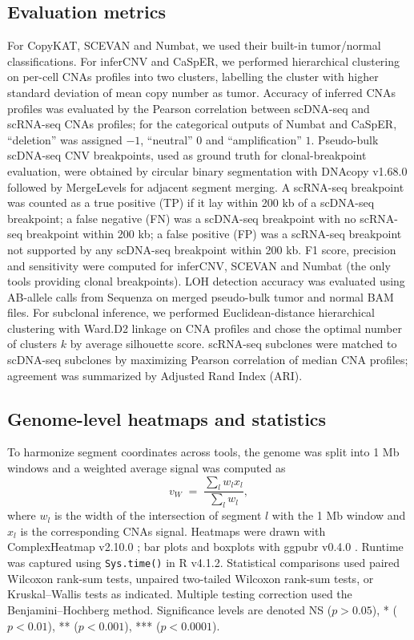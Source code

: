 \documentclass[11pt]{article}
\begin{document}
\subsection{Evaluation metrics}
For CopyKAT, SCEVAN and Numbat, we used their built-in tumor/normal classifications. For inferCNV and CaSpER, we performed hierarchical clustering on per-cell CNAs profiles into two clusters, labelling the cluster with higher standard deviation of mean copy number as tumor. Accuracy of inferred CNAs profiles was evaluated by the Pearson correlation between scDNA-seq and scRNA-seq CNAs profiles; for the categorical outputs of Numbat and CaSpER, ``deletion'' was assigned $-1$, ``neutral'' $0$ and ``amplification'' $1$. Pseudo-bulk scDNA-seq CNV breakpoints, used as ground truth for clonal-breakpoint evaluation, were obtained by circular binary segmentation with DNAcopy v1.68.0 \citep{olshen2004dnacopy} followed by MergeLevels \citep{willenbrock2005mergelevels} for adjacent segment merging. A scRNA-seq breakpoint was counted as a true positive (TP) if it lay within 200 kb of a scDNA-seq breakpoint; a false negative (FN) was a scDNA-seq breakpoint with no scRNA-seq breakpoint within 200 kb; a false positive (FP) was a scRNA-seq breakpoint not supported by any scDNA-seq breakpoint within 200 kb. F1 score, precision and sensitivity were computed for inferCNV, SCEVAN and Numbat (the only tools providing clonal breakpoints). LOH detection accuracy was evaluated using AB-allele calls from Sequenza \citep{favero2015sequenza} on merged pseudo-bulk tumor and normal BAM files. For subclonal inference, we performed Euclidean-distance hierarchical clustering with Ward.D2 linkage on CNA profiles and chose the optimal number of clusters $k$ by average silhouette score. scRNA-seq subclones were matched to scDNA-seq subclones by maximizing Pearson correlation of median CNA profiles; agreement was summarized by Adjusted Rand Index (ARI).

\subsection{Genome-level heatmaps and statistics}
To harmonize segment coordinates across tools, the genome was split into 1 Mb windows and a weighted average signal was computed as
\[
v_W \;=\; \frac{\sum_l w_l x_l}{\sum_l w_l},
\]
where $w_l$ is the width of the intersection of segment $l$ with the 1 Mb window and $x_l$ is the corresponding CNAs signal. Heatmaps were drawn with ComplexHeatmap v2.10.0 \citep{gu2016complexheatmap}; bar plots and boxplots with ggpubr v0.4.0 \citep{kassambara2020ggpubr}. Runtime was captured using \texttt{Sys.time()} in R v4.1.2. Statistical comparisons used paired Wilcoxon rank-sum tests, unpaired two-tailed Wilcoxon rank-sum tests, or Kruskal--Wallis tests as indicated. Multiple testing correction used the Benjamini--Hochberg method. Significance levels are denoted NS ($p > 0.05$), * ($p < 0.01$), ** ($p < 0.001$), *** ($p < 0.0001$).
\end{document}
